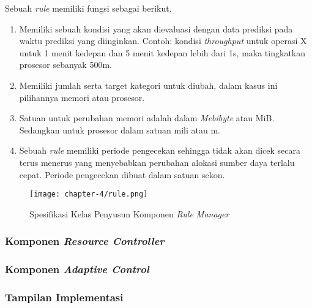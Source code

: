 
Sebuah \textit{rule} memiliki fungsi sebagai berikut.
\begin{enumerate}
    \item Memiliki sebuah kondisi yang akan dievaluasi dengan data prediksi pada waktu prediksi yang diinginkan. Contoh: kondisi \textit{throughput} untuk operasi X untuk 1 menit kedepan dan 5 menit kedepan lebih dari 1s, maka tingkatkan prosesor sebanyak 500m.
    \item Memiliki jumlah serta target kategori untuk diubah, dalam kasus ini pilihannya memori atau prosesor.
    \item Satuan untuk perubahan memori adalah dalam \textit{Mebibyte} atau MiB. Sedangkan untuk prosesor dalam satuan mili atau m.
    \item Sebuah \textit{rule} memiliki periode pengecekan sehingga tidak akan dicek secara terus menerus yang menyebabkan perubahan alokasi sumber daya terlalu cepat. Periode pengecekan dibuat dalam satuan sekon.
\end{enumerate}

\begin{figure}[h]
    \centering
    \texttt{[image: chapter-4/rule.png]}
    \caption{Spesifikasi Kelas Penyusun Komponen \textit{Rule Manager}}
    \label{fig:rule-spek}
\end{figure}

\subsubsection{Komponen \textit{Resource Controller}}
\blindtext

\subsubsection{Komponen \textit{Adaptive Control}}
\blindtext

\subsubsection{Tampilan Implementasi}
\blindtext